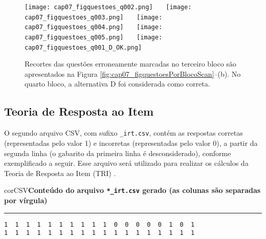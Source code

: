 
\begin{figure}[!ht]
\centering
\texttt{[image: cap07\_figquestoes\_q002.png]} \ \ \ 
\texttt{[image: cap07\_figquestoes\_q003.png]} \ \ \ 
\texttt{[image: cap07\_figquestoes\_q004.png]} \ \ \ 
\texttt{[image: cap07\_figquestoes\_q005.png]} \ \ \ 
\texttt{[image: cap07\_figquestoes\_q001\_D\_OK.png]} \ \ \ 
\caption{Recortes das questões erroneamente marcadas no terceiro bloco são apresentados na Figura \ref{fig:cap07_figquestoesPorBlocoScan}--(b). No quarto bloco, a alternativa D foi considerada como correta.}
\label{fig:cap07_figquestoesPorBlocoScanErros}
\end{figure}

\subsection{Teoria de Resposta ao Item}

O segundo arquivo CSV, com sufixo \verb|_irt.csv|, contém as respostas corretas (representadas pelo valor 1) e incorretas (representadas pelo valor 0), a partir da segunda linha (o gabarito da primeira linha é desconsiderado), conforme exemplificado a seguir. Esse arquivo será utilizado para realizar os cálculos da Teoria de Resposta ao Item (TRI) \cite{birnbaum1968some}.

\begin{myboxCode}{corCSV}{\textbf{Conteúdo do arquivo \texttt{*\_irt.csv} gerado (as colunas são separadas por vírgula)}}\vspace{3mm}
\hrule
{\footnotesize
\begin{verbatim}
1  1  1  1  1  1  1  1  1  1  0  0  0  0  0  1  0  1
1  1  1  1  1  1  1  1  1  1  1  1  1  1  1  1  1  1
\end{verbatim}
}
\end{myboxCode}

